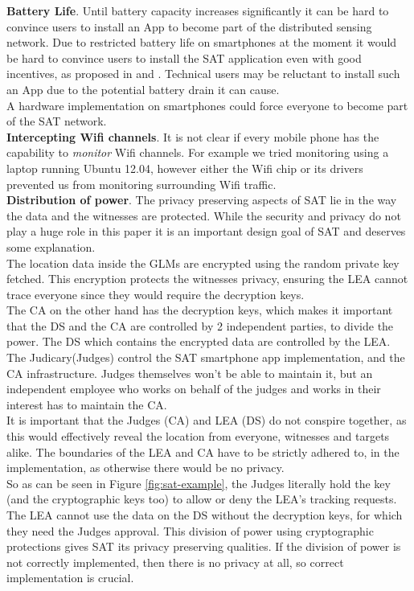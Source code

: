 \documentclass[10pt,titlepage]{article}
\begin{document}
\textbf{Battery Life}. Until battery capacity increases significantly it can be hard to convince users to install an App to become part of the distributed sensing network. Due to restricted battery life on smartphones at the moment it would be hard to convince users to install the SAT application even with good incentives, as proposed in \cite{SAT} and \cite{MALNET}. Technical users may be reluctant to install such an App due to the potential battery drain it can cause.\\
A hardware implementation on smartphones could force everyone to become part of the SAT network.\\

\textbf{Intercepting Wifi channels}. It is not clear if every mobile phone has the capability to \textit{monitor} Wifi channels. For example we tried monitoring using a laptop running Ubuntu 12.04, however either the Wifi chip or its drivers prevented us from monitoring surrounding Wifi traffic.\\

\textbf{Distribution of power}. The privacy preserving aspects of SAT lie in the way the data
and the witnesses are protected. While the security and privacy do not play
a huge role in this paper it is an important design goal of SAT and deserves some explanation.\\
The location data inside the GLMs are encrypted using the random private key fetched. This encryption
protects the witnesses privacy, ensuring the LEA cannot trace everyone since they would require the decryption keys.\\
The CA on the other hand has the decryption keys, which makes it important that the DS and the CA
are controlled by 2 independent parties, to divide the power. The DS which contains the encrypted data are controlled by the LEA. The Judicary(Judges) control the SAT smartphone app implementation, and the CA infrastructure. Judges themselves won't be able to maintain it, but an independent employee who works on behalf of the judges and works in their interest has to maintain the CA.\\
It is important that the Judges (CA) and LEA (DS) do not conspire together, as this would effectively reveal the location from everyone, witnesses and targets alike. The boundaries of the LEA and CA have to be strictly adhered to, in the implementation, as otherwise there would be no privacy.\\
So as can be seen in Figure \ref{fig:sat-example}, the Judges literally hold the key (and the cryptographic keys too) to allow or deny the LEA's tracking requests. The LEA cannot use the data on the DS without the decryption keys, for which they need the Judges approval. This division of power using cryptographic protections gives SAT its privacy preserving qualities. If the division of power is not correctly implemented, then there is no privacy at all, so correct implementation is crucial.\\
\end{document}
